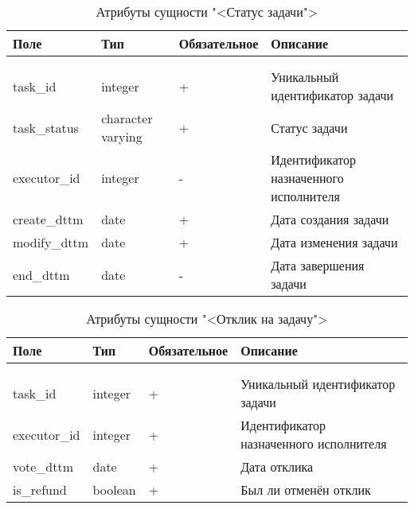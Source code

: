 \begin{xltabular}{\textwidth}{|l|l|p{1.7cm}|X|}
	\caption{Атрибуты сущности "<Статус задачи">\label{status:table}}\\ \hline
	\centrow Поле & \centrow Тип & \centrow Обяза\-тельное & \centrow Описание \\ \hline
	 &  &  &  \\ \hline
	\endfirsthead
	 &  &  &  \\ \hline
	\finishhead
	task\_id & integer & + & Уникальный идентификатор задачи \\ \hline 
	task\_status & character varying & + & Статус задачи \\ \hline 
	executor\_id & integer & - & Идентификатор назначенного исполнителя \\ \hline 
	create\_dttm & date & + & Дата создания задачи \\ \hline 
	modify\_dttm & date & + & Дата изменения задачи \\ \hline  
	end\_dttm & date & - & Дата завершения задачи
\end{xltabular}

\begin{xltabular}{\textwidth}{|l|l|p{1.7cm}|X|}
	\caption{Атрибуты сущности "<Отклик на задачу">\label{vote:table}}\\ \hline
	\centrow Поле & \centrow Тип & \centrow Обяза\-тельное & \centrow Описание \\ \hline
	 &  &  &  \\ \hline
	\endfirsthead
	 &  &  &  \\ \hline
	\finishhead
	task\_id & integer & + & Уникальный идентификатор задачи \\ \hline 
	executor\_id & integer & + & Идентификатор назначенного исполнителя \\ \hline 
	vote\_dttm & date & + & Дата отклика \\ \hline 
	is\_refund & boolean & + & Был ли отменён отклик 
\end{xltabular}


